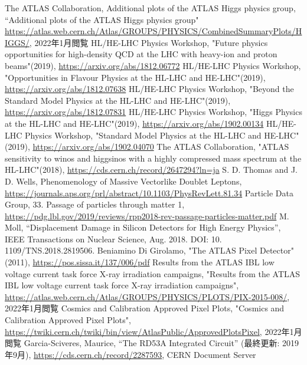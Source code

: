 \begin{thebibliography}{24}
The ATLAS Collaboration, Additional plots of the ATLAS Higgs physics group, “Additional plots of the ATLAS Higgs physics group" \url{https://atlas.web.cern.ch/Atlas/GROUPS/PHYSICS/CombinedSummaryPlots/HIGGS/}, 2022年1月閲覧
HL/HE-LHC Physics Workshop, "Future physics opportunities for high-density QCD at the LHC with heavy-ion and proton beams"(2019), \url{https://arxiv.org/abs/1812.06772}
HL/HE-LHC Physics Workshop, "Opportunities in Flavour Physics at the HL-LHC and HE-LHC"(2019), \url{https://arxiv.org/abs/1812.07638}
HL/HE-LHC Physics Workshop, "Beyond the Standard Model Physics at the HL-LHC and HE-LHC"(2019), \url{https://arxiv.org/abs/1812.07831}
HL/HE-LHC Physics Workshop, "Higgs Physics at the HL-LHC and HE-LHC"(2019), \url{https://arxiv.org/abs/1902.00134}
HL/HE-LHC Physics Workshop, "Standard Model Physics at the HL-LHC and HE-LHC"(2019), \url{https://arxiv.org/abs/1902.04070}
The ATLAS Collaboration, "ATLAS sensitivity to winos and higgsinos with a highly compressed mass spectrum at the HL-LHC"(2018), \url{https://cds.cern.ch/record/2647294?ln=ja}
S. D. Thomas and J. D. Wells, Phenomenology of Massive Vectorlike Doublet Leptons, \url{https://journals.aps.org/prl/abstract/10.1103/PhysRevLett.81.34}
Particle Data Group, 33. Passage of particles through matter 1,
\url{https://pdg.lbl.gov/2019/reviews/rpp2018-rev-passage-particles-matter.pdf}
M. Moll, “Displacement Damage in Silicon Detectors for High Energy Physics”, IEEE Transactions on Nuclear Science, Aug. 2018. DOI: 10. 1109/TNS.2018.2819506.
Beniamino Di Girolamo, "The ATLAS Pixel Detector" (2011), \url{https://pos.sissa.it/137/006/pdf}
Results from the ATLAS IBL low voltage current task force X-ray irradiation campaigns, "Results from the ATLAS IBL low voltage current task force X-ray irradiation campaigns", \url{https://atlas.web.cern.ch/Atlas/GROUPS/PHYSICS/PLOTS/PIX-2015-008/}, 2022年1月閲覧
Cosmics and Calibration Approved Pixel Plots, "Cosmics and Calibration Approved Pixel Plots", \url{https://twiki.cern.ch/twiki/bin/view/AtlasPublic/ApprovedPlotsPixel}, 2022年1月閲覧
Garcia-Sciveres, Maurice, “The RD53A Integrated Circuit” (最終更新: 2019年9月), \url{https://cds.cern.ch/record/2287593}, CERN Document Server

\end{thebibliography}
